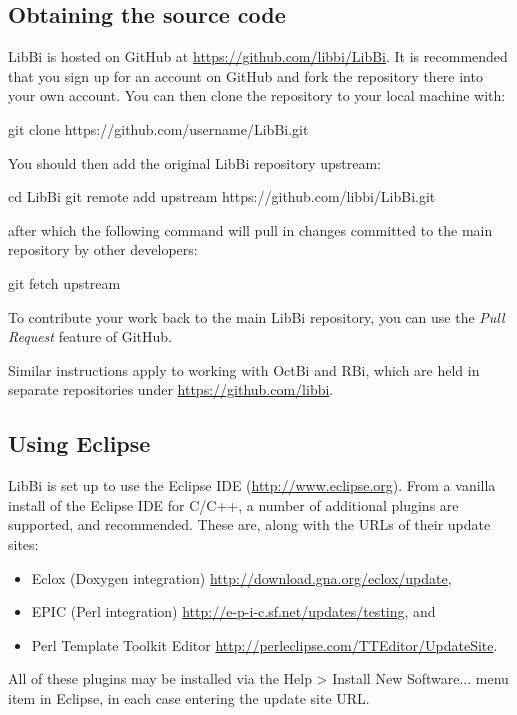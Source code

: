 \subsection{Obtaining the source code}

LibBi is hosted on GitHub at
\href{https://github.com/libbi/LibBi}{https://github.com/libbi/LibBi}. It is
recommended that you sign up for an account on GitHub and fork the repository
there into your own account. You can then clone the repository to your local
machine with:
\begin{cmdcode}
git clone https://github.com/username/LibBi.git
\end{cmdcode}
You should then add the original LibBi repository upstream:
\begin{cmdcode}
cd LibBi
git remote add upstream https://github.com/libbi/LibBi.git
\end{cmdcode}
after which the following command will pull in changes committed to the main
repository by other developers:
\begin{cmdcode}
git fetch upstream
\end{cmdcode}
To contribute your work back to the main LibBi repository, you can use the
\emph{Pull Request} feature of GitHub.

Similar instructions apply to working with OctBi and RBi, which are held in
separate repositories under \href{https://github.com/libbi}{https://github.com/libbi}.

\subsection{Using Eclipse\label{Using_Eclipse}}

LibBi is set up to use the Eclipse IDE
(\href{http://www.eclipse.org}{http://www.eclipse.org}). From a vanilla
install of the Eclipse IDE for C/C++, a number of additional plugins are
supported, and recommended. These are, along with the URLs of their update
sites:
\begin{itemize}
\item Eclox (Doxygen integration) \href{http://download.gna.org/eclox/update}{http://download.gna.org/eclox/update},
\item EPIC (Perl integration) \href{http://e-p-i-c.sf.net/updates/testing}{http://e-p-i-c.sf.net/updates/testing}, and
\item Perl Template Toolkit Editor \href{http://perleclipse.com/TTEditor/UpdateSite}{http://perleclipse.com/TTEditor/UpdateSite}.
\end{itemize}
All of these plugins may be installed via the \textsf{Help > Install New Software...}
menu item in Eclipse, in each case entering the update site URL.

